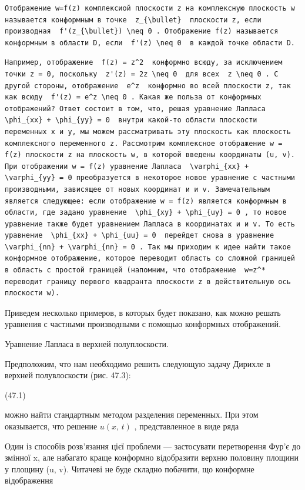 \documentclass[
  ukrainian,
]{article}
\begin{document}
\begin{verbatim}
Отображение w=f(z) комплексиой плоскости z на комплексную плоскость w называется конформным в точке  z_{\bullet}  плоскости z, если производная  f'(z_{\bullet}) \neq 0 . Отображение f(z) называется конформным в области D, если  f'(z) \neq 0  в каждой точке области D.
\end{verbatim}

\begin{verbatim}
Например, отображение  f(z) = z^2  конформно всюду, за исключением точки z = 0, поскольку  z'(z) = 2z \neq 0  для всех  z \neq 0 . C другой стороны, отображение  e^z  конформно во всей плоскости z, так как всюду  f'(z) = e^z \neq 0 . Какая же польза от конформных отображений? Ответ состоит в том, что, решая уравнение Лапласа  \phi_{xx} + \phi_{yy} = 0  внутри какой-то области плоскости переменных x и y, мы можем рассматривать эту плоскость как плоскость комплексного переменного z. Рассмотрим комплексное отображение w = f(z) плоскости z на плоскость w, в которой введены координаты (u, v). При отображении w = f(z) уравнение Лапласа  \varphi_{xx} + \varphi_{yy} = 0 преобразуется в некоторое новое уравнение с частными производными, зависящее от новых координат и и v. Замечательным является следующее: если отображение w = f(z) является конформным в области, где задано уравнение  \phi_{xy} + \phi_{uy} = 0 , то новое уравнение также будет уравнением Лапласа в координатах и и v. To есть уравнение  \phi_{xx} + \phi_{uu} = 0  перейдет снова в уравнение  \varphi_{nn} + \varphi_{nn} = 0 . Так мы приходим к идее найти такое конформное отображение, которое переводит область со сложной границей в область с простой границей (напомним, что отображение  w=z^*  переводит границу первого квадранта плоскости z в действительную ось плоскости w).
\end{verbatim}

Приведем несколько примеров, в которых будет показано, как можно решать
уравнения с частными производными с помощью конформных отображений.

Уравнение Лапласа в верхней полуплоскости.

Предположим, что нам необходимо решить следующую задачу Дирихле в
верхней полувлоскости (рис. 47.3):

(47.1)

можно найти стандартным методом разделения переменных. При этом
оказывается, что решение \(u\left(x,\,t\right)\) , представленное в виде
ряда

Один із способів розв'язання цієї проблеми --- застосувати перетворення
Фур'є до змінної x, але набагато краще конформно відобразити верхню
половину площини у площину (u, v). Читачеві не буде складно побачити, що
конформне відображення
\end{document}
